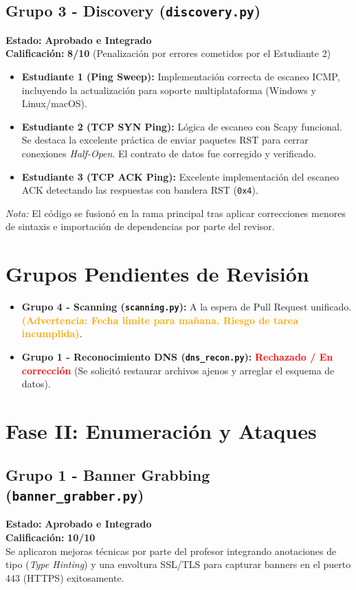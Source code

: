 \documentclass[12pt,a4paper]{article}
\begin{document}
\subsection*{Grupo 3 - Discovery (\texttt{discovery.py})}
\textbf{Estado:} \textcolor{green!70!black}{\textbf{Aprobado e Integrado}} \\
\textbf{Calificación:} \textbf{8/10} (Penalización por errores cometidos por el Estudiante 2)
\begin{itemize}[label=$\bullet$]
    \item \textbf{Estudiante 1 (Ping Sweep):} Implementación correcta de escaneo ICMP, incluyendo la actualización para soporte multiplataforma (Windows y Linux/macOS).
    \item \textbf{Estudiante 2 (TCP SYN Ping):} Lógica de escaneo con Scapy funcional. Se destaca la excelente práctica de enviar paquetes RST para cerrar conexiones \textit{Half-Open}. El contrato de datos fue corregido y verificado.
    \item \textbf{Estudiante 3 (TCP ACK Ping):} Excelente implementación del escaneo ACK detectando las respuestas con bandera RST (\texttt{0x4}).
\end{itemize}
\textit{Nota:} El código se fusionó en la rama principal tras aplicar correcciones menores de sintaxis e importación de dependencias por parte del revisor.

\section*{Grupos Pendientes de Revisión}
\begin{itemize}[label=$\bullet$]
    \item \textbf{Grupo 4 - Scanning (\texttt{scanning.py}):} A la espera de Pull Request unificado. \textcolor{orange}{\textbf{(Advertencia: Fecha límite para mañana. Riesgo de tarea incumplida)}}.
    \item \textbf{Grupo 1 - Reconocimiento DNS (\texttt{dns\_recon.py}):} \textcolor{red}{\textbf{Rechazado / En corrección}} (Se solicitó restaurar archivos ajenos y arreglar el esquema de datos).
\end{itemize}

\section*{Fase II: Enumeración y Ataques}

\subsection*{Grupo 1 - Banner Grabbing (\texttt{banner\_grabber.py})}
\textbf{Estado:} \textcolor{green!70!black}{\textbf{Aprobado e Integrado}} \\
\textbf{Calificación:} \textbf{10/10} \\
Se aplicaron mejoras técnicas por parte del profesor integrando anotaciones de tipo (\textit{Type Hinting}) y una envoltura SSL/TLS para capturar banners en el puerto 443 (HTTPS) exitosamente.
\end{document}
